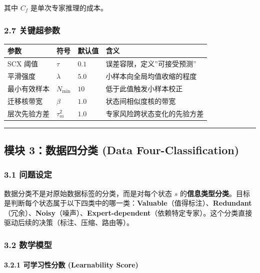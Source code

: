 \documentclass[
  12pt,
]{ctexart}
\begin{document}
其中 \(C_f\) 是单次专家推理的成本。

\subsubsection{2.7 关键超参数}\label{ux5173ux952eux8d85ux53c2ux6570-1}

\begin{longtable}[]{@{}llll@{}}
\toprule\noalign{}
参数 & 符号 & 默认值 & 含义 \\
\midrule\noalign{}
\endhead
\bottomrule\noalign{}
\endlastfoot
SCX 阈值 & \(\tau\) & \(0.1\) & 误差容限，定义''可接受预测'' \\
平滑强度 & \(\lambda\) & \(5.0\) & 小样本向全局均值收缩的程度 \\
最小有效样本 & \(N_{\min}\) & \(10\) & 低于此值触发小样本校正 \\
迁移核带宽 & \(\beta\) & \(1.0\) & 状态间相似度核的带宽 \\
层次先验方差 & \(\tau_m^2\) & \(1.0\) & 专家风险跨状态变化的先验方差 \\
\end{longtable}

\begin{center}\rule{0.5\linewidth}{0.5pt}\end{center}

\subsection{模块 3：数据四分类 (Data
Four-Classification)}\label{ux6a21ux5757-3ux6570ux636eux56dbux5206ux7c7b-data-four-classification}

\subsubsection{3.1 问题设定}\label{ux95eeux9898ux8bbeux5b9a-2}

数据分类不是对原始数据标签的分类，而是对每个状态 \(s\)
的\textbf{信息类型分类}。目标是判断每个状态属于以下四类中的哪一类：\textbf{Valuable}（值得标注）、\textbf{Redundant}（冗余）、\textbf{Noisy}（噪声）、\textbf{Expert-dependent}（依赖特定专家）。这个分类直接驱动后续的决策（标注、压缩、路由等）。

\subsubsection{3.2 数学模型}\label{ux6570ux5b66ux6a21ux578b-2}

\paragraph{3.2.1 可学习性分数 (Learnability
Score)}\label{ux53efux5b66ux4e60ux6027ux5206ux6570-learnability-score}
\end{document}
